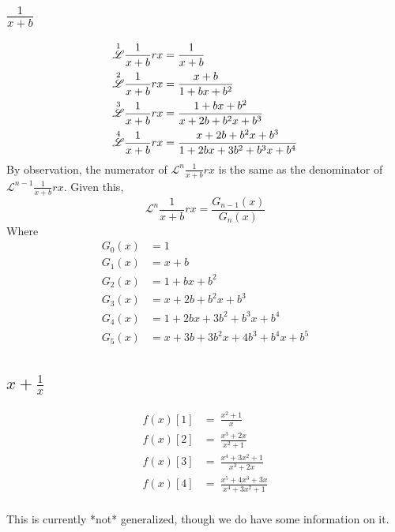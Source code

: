 \documentclass[12pt, letterpaper]{article}
\begin{document}
\subsection{$\frac{1}{x+b}$}
\begin{equation}
    \begin{split}
        \overset{1}{\mathscr{L}} \frac{1}{x+b} rx & = \frac{1}{x+b}\\
        \overset{2}{\mathscr{L}} \frac{1}{x+b} rx & = \frac{x+b}{1+bx+b^2}\\
        \overset{3}{\mathscr{L}} \frac{1}{x+b} rx & = \frac{1+bx+b^2}{x+2b+b^2x+b^3}\\
        \overset{4}{\mathscr{L}} \frac{1}{x+b} rx & = \frac{x+2b+b^2x+b^3}{1+2bx+3b^2+b^3x+b^4}\\
    \end{split}
\end{equation}
By observation, the numerator of $\mathscr{L}^n \frac{1}{x+b} rx$ is the same as the denominator of $\mathscr{L}^{n-1} \frac{1}{x+b} rx$. Given this,
$$\mathscr{L}^{n} \frac{1}{x+b} rx = \frac{G_{n-1}(x)}{G_n(x)}$$
Where
\begin{equation}
    \begin{split}
        G_0(x) & = 1\\
        G_1(x) & = x+b\\
        G_2(x) & = 1+bx+b^2\\
        G_3(x) & = x+2b+b^2x+b^3\\
        G_4(x) & = 1+2bx+3b^2+b^3x+b^4\\
        G_5(x) & = x+3b+3b^2x+4b^3+b^4x+b^5\\
    \end{split}
\end{equation}

\subsection{$x + \frac{1}{x}$}
\begin{equation}
    \begin{split}
        f(x)[1] & = \  \frac{x^2+1}{x}\\
        f(x)[2] & = \  \frac{x^3+2x}{x^2+1}\\
        f(x)[3] & = \  \frac{x^4+3x^2+1}{x^3+2x}\\
        f(x)[4] & = \ \frac{x^5+4x^3+3x}{x^4+3x^2+1}\\
    \end{split}
\end{equation}

This is currently *not* generalized, though we do have some information on it.
\end{document}
